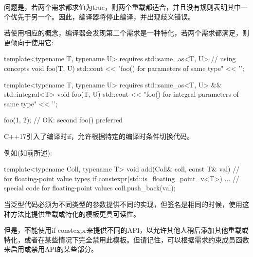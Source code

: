 问题是，若两个需求都求值为true，则两个重载都适合，并且没有规则表明其中一个优先于另一个。因此，编译器将停止编译，并出现歧义错误。

若使用相应的概念，编译器会发现第二个需求是一种特化，若两个需求都满足，则更倾向于使用它:

\begin{cpp}
template<typename T, typename U>
requires std::same_as<T, U> // using concepts
void foo(T, U)
{
	std::cout << "foo() for parameters of same type" << '\n';
}

template<typename T, typename U>
requires std::same_as<T, U> && std::integral<T>
void foo(T, U)
{
	std::cout << "foo() for integral parameters of same type" << '\n';
}

foo(1, 2); // OK: second foo() preferred
\end{cpp}


C++17引入了编译时if，允许根据特定的编译时条件切换代码。

例如(如前所述):

\begin{cpp}
template<typename Coll, typename T>
void add(Coll& coll, const T& val) // for floating-point value types
{
	if constexpr(std::is_floating_point_v<T>) {
		... // special code for floating-point values
	}
	coll.push_back(val);
}
\end{cpp}

当泛型代码必须为不同类型的参数提供不同的实现，但签名是相同的时候，使用这种方法比提供重载或特化的模板更具可读性。

但是，不能使用if constexpr来提供不同的API，以允许其他人稍后添加其他重载或特化，或者在某些情况下完全禁用此模板。但请记住，可以根据需求约束成员函数来启用或禁用API的某些部分。








